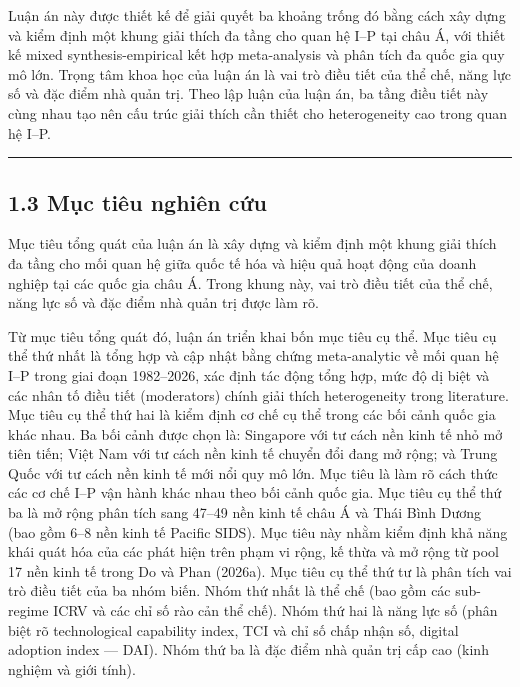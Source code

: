 \documentclass[12pt,a4paper]{article}
\begin{document}
Luận án này được thiết kế để giải quyết ba khoảng trống đó bằng cách xây
dựng và kiểm định một khung giải thích đa tầng cho quan hệ I--P tại châu
Á, với thiết kế mixed synthesis-empirical kết hợp meta-analysis và phân
tích đa quốc gia quy mô lớn. Trọng tâm khoa học của luận án là vai trò
điều tiết của thể chế, năng lực số và đặc điểm nhà quản trị. Theo lập
luận của luận án, ba tầng điều tiết này cùng nhau tạo nên cấu trúc giải
thích cần thiết cho heterogeneity cao trong quan hệ I--P.

\begin{center}\rule{0.5\linewidth}{0.5pt}\end{center}

\hypertarget{13-mux1ee5c-tiuxeau-nghiuxean-cux1ee9u}{%
\subsection{1.3 Mục tiêu nghiên
cứu}\label{13-mux1ee5c-tiuxeau-nghiuxean-cux1ee9u}}

Mục tiêu tổng quát của luận án là xây dựng và kiểm định một khung giải
thích đa tầng cho mối quan hệ giữa quốc tế hóa và hiệu quả hoạt động của
doanh nghiệp tại các quốc gia châu Á. Trong khung này, vai trò điều tiết
của thể chế, năng lực số và đặc điểm nhà quản trị được làm rõ.

Từ mục tiêu tổng quát đó, luận án triển khai bốn mục tiêu cụ thể. Mục
tiêu cụ thể thứ nhất là tổng hợp và cập nhật bằng chứng meta-analytic về
mối quan hệ I--P trong giai đoạn 1982--2026, xác định tác động tổng hợp,
mức độ dị biệt và các nhân tố điều tiết (moderators) chính giải thích
heterogeneity trong literature. Mục tiêu cụ thể thứ hai là kiểm định cơ
chế cụ thể trong các bối cảnh quốc gia khác nhau. Ba bối cảnh được chọn
là: Singapore với tư cách nền kinh tế nhỏ mở tiên tiến; Việt Nam với tư
cách nền kinh tế chuyển đổi đang mở rộng; và Trung Quốc với tư cách nền
kinh tế mới nổi quy mô lớn. Mục tiêu là làm rõ cách thức các cơ chế I--P
vận hành khác nhau theo bối cảnh quốc gia. Mục tiêu cụ thể thứ ba là mở
rộng phân tích sang 47--49 nền kinh tế châu Á và Thái Bình Dương (bao
gồm 6--8 nền kinh tế Pacific SIDS). Mục tiêu này nhằm kiểm định khả năng
khái quát hóa của các phát hiện trên phạm vi rộng, kế thừa và mở rộng từ
pool 17 nền kinh tế trong Do và Phan (2026a). Mục tiêu cụ thể thứ tư là
phân tích vai trò điều tiết của ba nhóm biến. Nhóm thứ nhất là thể chế
(bao gồm các sub-regime ICRV và các chỉ số rào cản thể chế). Nhóm thứ
hai là năng lực số (phân biệt rõ technological capability index, TCI và
chỉ số chấp nhận số, digital adoption index --- DAI). Nhóm thứ ba là đặc
điểm nhà quản trị cấp cao (kinh nghiệm và giới tính).
\end{document}
